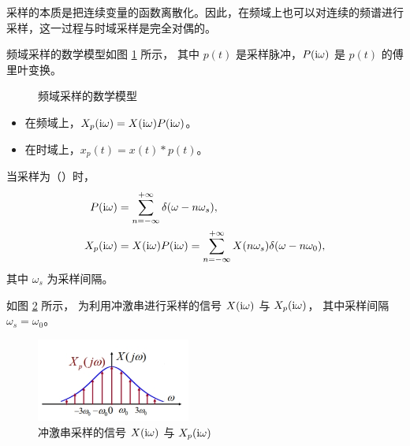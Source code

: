 采样的本质是把连续变量的函数离散化。因此，在频域上也可以对连续的频谱进行采样，这一过程与时域采样是完全对偶的。

\begin{definition}[频域采样]
    频域采样的数学模型如图 \ref{fig:sampling-freq-math-model} 所示，
    其中 $p(t)$ 是采样脉冲，$P(\mathrm{i} \omega)$ 是 $p(t)$ 的傅里叶变换。
    \begin{figure}[H]
        \centering
        \caption{频域采样的数学模型}
        \label{fig:sampling-freq-math-model}
    \end{figure}

    \begin{itemize}
        \item 在频域上，$X_p(\mathrm{i} \omega) = X(\mathrm{i} \omega) P(\mathrm{i} \omega)$。
        \item 在时域上，$x_p(t) = x(t) * p(t)$。
    \end{itemize}
    当采样为（）时，
    \begin{align*}
        P(\mathrm{i}\omega) & = \sum_{n = -\infty}^{+\infty}\delta(\omega - n\omega_s), \\
        X_p(\mathrm{i}\omega) & = X(\mathrm{i}\omega)P(\mathrm{i}\omega) = \sum_{n = -\infty}^{+\infty}X(n\omega_s)\delta(\omega - n\omega_0),
    \end{align*}
    其中 $\omega_s$ 为采样间隔。
\end{definition}

\begin{example}
    如图 \ref{fig:impulse-sampling-freq} 所示，
    为利用冲激串进行采样的信号 $X(\mathrm{i}\omega)$ 与 $X_p(\mathrm{i}\omega)$，
    其中采样间隔 $\omega_s = \omega_0$。
    \begin{figure}[H]
        \centering
        \includegraphics[width=0.45\textwidth]{chap2/img/impulse-sampling-freq.png}
        \caption{冲激串采样的信号 $X(\mathrm{i}\omega)$ 与 $X_p(\mathrm{i}\omega)$}
        \label{fig:impulse-sampling-freq}
    \end{figure}
\end{example}

